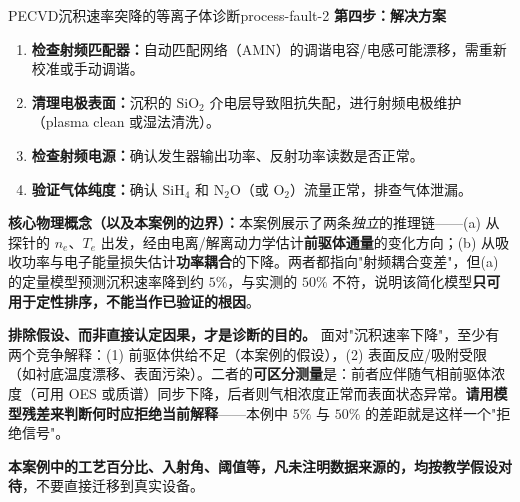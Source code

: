 \documentclass[12pt,a4paper,openany,oneside]{book}
\begin{document}
\begin{example}{PECVD沉积速率突降的等离子体诊断}{process-fault-2}
\textbf{第四步：解决方案}

\begin{enumerate}
    \item \textbf{检查射频匹配器：}自动匹配网络（AMN）的调谐电容/电感可能漂移，需重新校准或手动调谐。
    \item \textbf{清理电极表面：}沉积的 $\mathrm{SiO}_2$ 介电层导致阻抗失配，进行射频电极维护（plasma clean 或湿法清洗）。
    \item \textbf{检查射频电源：}确认发生器输出功率、反射功率读数是否正常。
    \item \textbf{验证气体纯度：}确认 $\mathrm{SiH}_4$ 和 $\mathrm{N}_2\mathrm{O}$（或 $\mathrm{O}_2$）流量正常，排查气体泄漏。
\end{enumerate}

\textbf{核心物理概念（以及本案例的边界）：}本案例展示了两条\emph{独立}的推理链——(a) 从探针的 $n_e$、$T_e$ 出发，经由电离/解离动力学估计\textbf{前驱体通量}的变化方向；(b) 从吸收功率与电子能量损失估计\textbf{功率耦合}的下降。两者都指向"射频耦合变差"，但(a) 的定量模型预测沉积速率降到约 $5\%$，与实测的 $50\%$ 不符，说明该简化模型\textbf{只可用于定性排序，不能当作已验证的根因}。

\textbf{排除假设、而非直接认定因果，才是诊断的目的。} 面对"沉积速率下降"，至少有两个竞争解释：(1) 前驱体供给不足（本案例的假设），(2) 表面反应/吸附受限（如衬底温度漂移、表面污染）。二者的\textbf{可区分测量}是：前者应伴随气相前驱体浓度（可用 OES 或质谱）同步下降，后者则气相浓度正常而表面状态异常。\textbf{请用模型残差来判断何时应拒绝当前解释}——本例中 $5\%$ 与 $50\%$ 的差距就是这样一个"拒绝信号"。

\textbf{本案例中的工艺百分比、入射角、阈值等，凡未注明数据来源的，均按教学假设对待}，不要直接迁移到真实设备。
\end{example}
\end{document}
